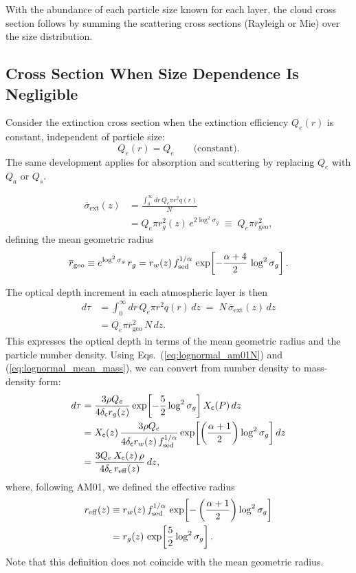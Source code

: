 With the abundance of each particle size known for each layer, the cloud cross section follows by summing the scattering cross sections (Rayleigh or Mie) over the size distribution.

\subsection*{Cross Section When Size Dependence Is Negligible}

Consider the extinction cross section when the extinction efficiency $Q_e(r)$ is constant, independent of particle size:
\begin{equation}
    Q_e (r) = Q_e \qquad \text{(constant)}.
\end{equation}
The same development applies for absorption and scattering by replacing $Q_e$ with $Q_a$ or $Q_s$.

\begin{align}
\overline{\sigma}_\mathrm{ext}(z) &= \frac{\int_0^\infty dr \, Q_e \pi r^2 q(r)}{N} \\
&=  Q_e \pi r_g^2(z)\, e^{2\log^2{\sigma_g}} \;\equiv\; Q_e \pi \overline{r}_\mathrm{geo}^2,
\end{align}
defining the mean geometric radius
\begin{align}
\overline{r}_\mathrm{geo} \equiv e^{\log^2{\sigma_g}}\, r_g 
= r_w(z)\, f_\mathrm{sed}^{1/\alpha}\, \exp\!\left[-\frac{\alpha+4}{2}\, \log^2{\sigma_g}\right].
\end{align}

The optical depth increment in each atmospheric layer is then
\begin{align}
d \tau &= \int_0^\infty dr \, Q_e \pi r^2 q(r)\, dz \;=\; N\, \overline{\sigma}_\mathrm{ext}(z)\, dz \\
&= Q_e \pi \overline{r}_\mathrm{geo}^2\, N\, dz.
\end{align}
This expresses the optical depth in terms of the mean geometric radius and the particle number density.  
Using Eqs.~(\ref{eq:lognormal_am01N}) and (\ref{eq:lognormal_mean_mass}), we can convert from number density to mass-density form:
\begin{align}
\label{eq:dtaucloud0}
d \tau &= \frac{3  \rho Q_e }{4 \delta_{\mathsf{c}} r_g(z)} 
\exp\!\left[ - \frac{5}{2} \log^2{\sigma_g} \right]  X_{\mathsf{c}} (P)\, dz \\
&= X_{\mathsf{c}}  (z)\, \frac{3 \rho Q_e }{4 \delta_{\mathsf{c}} r_w(z)\, f_\mathrm{sed}^{1/\alpha}}  
\exp\!\left[ \left( \frac{\alpha + 1}{2} \right) \log^2{\sigma_g} \right] dz \\
\label{eq:dtaucloud1}
&= \frac{3 Q_e\, X_{\mathsf{c}}  (z)\, \rho}{4 \delta_{\mathsf{c}}\, r_\mathrm{eff}(z)} \, dz,
\end{align}
where, following AM01, we defined the effective radius
\begin{align}
r_\mathrm{eff}(z) &\equiv r_w(z)\, f_\mathrm{sed}^{1/\alpha}\, \exp\!\left[ - \left( \frac{\alpha + 1}{2} \right) \log^2{\sigma_g} \right] \\
&= r_g(z)\, \exp\!\left[ \frac{5}{2} \log^2{\sigma_g} \right].
\end{align}
Note that this definition does not coincide with the mean geometric radius.

